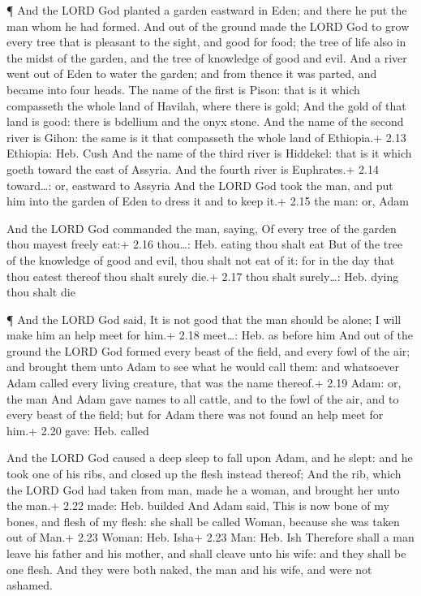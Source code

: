 ¶ And the LORD God planted a garden eastward in Eden; and
there he put the man whom he had formed.  And out of the
ground made the LORD God to grow every tree that is pleasant to the
sight, and good for food; the tree of life also in the midst of the
garden, and the tree of knowledge of good and evil.  And a
river went out of Eden to water the garden; and from thence it was
parted, and became into four heads.  The name of the first
is Pison: that is it which compasseth the whole land of Havilah, where
there is gold;  And the gold of that land is good: there is
bdellium and the onyx stone.  And the name of the second
river is Gihon: the same is it that compasseth the whole land of
Ethiopia.+ 2.13 Ethiopia: Heb. Cush  And the name of the
third river is Hiddekel: that is it which goeth toward the east of
Assyria. And the fourth river is Euphrates.+ 2.14 toward\ldots: or,
eastward to Assyria  And the LORD God took the man, and put
him into the garden of Eden to dress it and to keep it.+ 2.15 the man:
or, Adam

 And the LORD God commanded the man, saying, Of every tree
of the garden thou mayest freely eat:+ 2.16 thou\ldots: Heb. eating thou
shalt eat  But of the tree of the knowledge of good and
evil, thou shalt not eat of it: for in the day that thou eatest thereof
thou shalt surely die.+ 2.17 thou shalt surely\ldots: Heb. dying thou
shalt die

 ¶ And the LORD God said, It is not good that the man
should be alone; I will make him an help meet for him.+ 2.18 meet\ldots:
Heb. as before him  And out of the ground the LORD God
formed every beast of the field, and every fowl of the air; and brought
them unto Adam to see what he would call them: and whatsoever Adam
called every living creature, that was the name thereof.+ 2.19 Adam: or,
the man  And Adam gave names to all cattle, and to the fowl
of the air, and to every beast of the field; but for Adam there was not
found an help meet for him.+ 2.20 gave: Heb. called

 And the LORD God caused a deep sleep to fall upon Adam,
and he slept: and he took one of his ribs, and closed up the flesh
instead thereof;  And the rib, which the LORD God had taken
from man, made he a woman, and brought her unto the man.+ 2.22 made:
Heb. builded  And Adam said, This is now bone of my bones,
and flesh of my flesh: she shall be called Woman, because she was taken
out of Man.+ 2.23 Woman: Heb. Isha+ 2.23 Man: Heb. Ish 
Therefore shall a man leave his father and his mother, and shall cleave
unto his wife: and they shall be one flesh.  And they were
both naked, the man and his wife, and were not ashamed.

